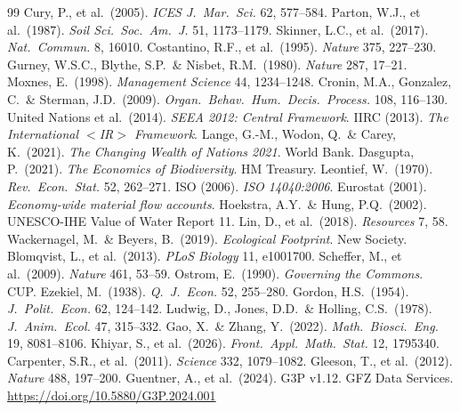 \documentclass[11pt]{article}
\theoremstyle{definition}
\begin{document}
\begin{thebibliography}{99}
 Cury, P., et al.\ (2005). \textit{ICES J.\ Mar.\ Sci.} 62, 577--584.
 Parton, W.J., et al.\ (1987). \textit{Soil Sci.\ Soc.\ Am.\ J.} 51, 1173--1179.
 Skinner, L.C., et al.\ (2017). \textit{Nat.\ Commun.} 8, 16010.
 Costantino, R.F., et al.\ (1995). \textit{Nature} 375, 227--230.
 Gurney, W.S.C., Blythe, S.P.\ \& Nisbet, R.M.\ (1980). \textit{Nature} 287, 17--21.
 Moxnes, E.\ (1998). \textit{Management Science} 44, 1234--1248.
 Cronin, M.A., Gonzalez, C.\ \& Sterman, J.D.\ (2009). \textit{Organ.\ Behav.\ Hum.\ Decis.\ Process.} 108, 116--130.
 United Nations et al.\ (2014). \textit{SEEA 2012: Central Framework}.
 IIRC (2013). \textit{The International $<$IR$>$ Framework}.
 Lange, G.-M., Wodon, Q.\ \& Carey, K.\ (2021). \textit{The Changing Wealth of Nations 2021}. World Bank.
 Dasgupta, P.\ (2021). \textit{The Economics of Biodiversity}. HM Treasury.
 Leontief, W.\ (1970). \textit{Rev.\ Econ.\ Stat.} 52, 262--271.
 ISO (2006). \textit{ISO 14040:2006}.
 Eurostat (2001). \textit{Economy-wide material flow accounts}.
 Hoekstra, A.Y.\ \& Hung, P.Q.\ (2002). UNESCO-IHE Value of Water Report 11.
 Lin, D., et al.\ (2018). \textit{Resources} 7, 58.
 Wackernagel, M.\ \& Beyers, B.\ (2019). \textit{Ecological Footprint}. New Society.
 Blomqvist, L., et al.\ (2013). \textit{PLoS Biology} 11, e1001700.
 Scheffer, M., et al.\ (2009). \textit{Nature} 461, 53--59.
 Ostrom, E.\ (1990). \textit{Governing the Commons}. CUP.
 Ezekiel, M.\ (1938). \textit{Q.\ J.\ Econ.} 52, 255--280.
 Gordon, H.S.\ (1954). \textit{J.\ Polit.\ Econ.} 62, 124--142.
 Ludwig, D., Jones, D.D.\ \& Holling, C.S.\ (1978). \textit{J.\ Anim.\ Ecol.} 47, 315--332.
 Gao, X.\ \& Zhang, Y.\ (2022). \textit{Math.\ Biosci.\ Eng.} 19, 8081--8106.
 Khiyar, S., et al.\ (2026). \textit{Front.\ Appl.\ Math.\ Stat.} 12, 1795340.
 Carpenter, S.R., et al.\ (2011). \textit{Science} 332, 1079--1082.
 Gleeson, T., et al.\ (2012). \textit{Nature} 488, 197--200.
 Guentner, A., et al.\ (2024). G3P v1.12. GFZ Data Services. \url{https://doi.org/10.5880/G3P.2024.001}

\end{thebibliography}
\end{document}
